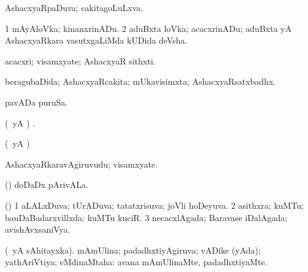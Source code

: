 {{{{{{\bentry
{} 
\gl{\gu}
\expl{}
\bmng
AshacxyaRpaDuva; cakitagoLuLxva. 
\emng
\eentry

\bentry
{} 
\gl{\nA}
\expl{}
\bmng
\bnum
\num{1} mAyAloVka; kinanxrinADu. 
\num{2} aduBxta loVka; acacxrinADu; aduBxta yA AshacxyaRkara vasutxgaLiMda kUDida deVsha. 
\enum
\emng
\eentry

\bentry
{} 
\gl{\nA}
\expl{}
\bmng
acacxri; visamxyate; AshacxyaR sithxti. 
\emng
\eentry

\bentry
{} 
\gl{\gu}
\expl{}
\bmng
{} 
\emng
\eentry

\bentry
{} 
\gl{\gu}
\expl{}
\bmng
beragubaDida; AshacxyaRcakita; mUkavisimxta; AshacxyaRsatxbadhx. 
\emng
\eentry

\bentry
{} 
\gl{\nA}
\expl{}
\bmng
pavADa puruSa. 
\emng
\eentry

\bentry
{} 
\gl{\gu}
\expl{}
\bmng
(\kAparx\ yA \rUpa) . 
\emng
\eentry

\bentry
{} 
\gl{\kirxvi}
\expl{}
\bmng
\emng
\eentry

\bentry
{} 
\gl{\kirxvi}
\expl{}
\bmng
(\kAparx\ yA \rUpa)  
\emng
\eentry

\bentry
{} 
\gl{\nA}
\bmng
AshacxyaRkaravAgiruvudu; visamxyate. 
\emng
\eentry

\bentry
{} 
\gl{\nA}
\expl{}
\bmng
(\AseTxrXV) doDaDx pArivALa. 
\emng
\eentry

\bentry
{} 
\gl{\gu}
\bmng
(\AmA) 
\bnum
\num{1} aLALxDuva; tUrADuva; tatatxrisuva; joVli hoDeyuva. 
\num{2} asithxra; kuMTu; bauDaBadarxvillxda:  kuMTu kuciR. 
\num{3} necacxlAgada; Baravase iDalAgada; avishAvxsaniVya. 
\enum
\emng
\eentry

\bentry
{} 
\gl{\gu}
\expl{}
\bmng
(\pArxparx\ yA sAhitayxka). mAmUlina; padadhxtiyAgiruva; vADike (yAda); yathAriVtiya; eMdinaMtaha:  avana mAmUlinaMte, padadhxtiyaMte. 
\emng

}}}}}}

